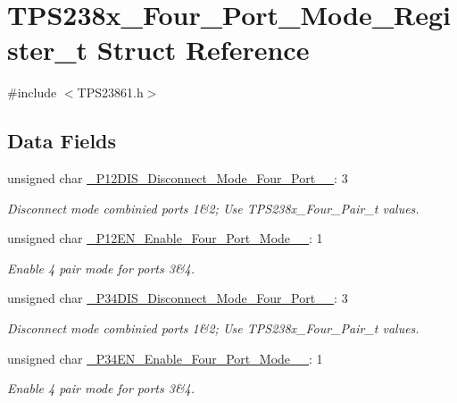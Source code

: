 \hypertarget{struct_t_p_s238x___four___port___mode___register__t}{\section{T\-P\-S238x\-\_\-\-Four\-\_\-\-Port\-\_\-\-Mode\-\_\-\-Register\-\_\-t Struct Reference}
\label{struct_t_p_s238x___four___port___mode___register__t}
}


{\ttfamily \#include $<$T\-P\-S23861.\-h$>$}

\subsection*{Data Fields}
\begin{DoxyCompactItemize}
\item 
unsigned char \hyperlink{struct_t_p_s238x___four___port___mode___register__t_a645698bd12e705f53aaf605d6ea8d5b6}{\-\_\-P12\-D\-I\-S\-\_\-\-Disconnect\-\_\-\-Mode\-\_\-\-Four\-\_\-\-Port\-\_\-\_}\-: 3
\begin{DoxyCompactList}\small\item\em Disconnect mode combinied ports 1\&2; Use T\-P\-S238x\-\_\-\-Four\-\_\-\-Pair\-\_\-t values. \end{DoxyCompactList}\item 
unsigned char \hyperlink{struct_t_p_s238x___four___port___mode___register__t_a39e1be93c2acd9f8e22aaf9f8bbe1f2d}{\-\_\-P12\-E\-N\-\_\-\-Enable\-\_\-\-Four\-\_\-\-Port\-\_\-\-Mode\-\_\-\_}\-: 1
\begin{DoxyCompactList}\small\item\em Enable 4 pair mode for ports 3\&4. \end{DoxyCompactList}\item 
unsigned char \hyperlink{struct_t_p_s238x___four___port___mode___register__t_a95d699031b796a9637f8dc05e80958a9}{\-\_\-P34\-D\-I\-S\-\_\-\-Disconnect\-\_\-\-Mode\-\_\-\-Four\-\_\-\-Port\-\_\-\_}\-: 3
\begin{DoxyCompactList}\small\item\em Disconnect mode combinied ports 1\&2; Use T\-P\-S238x\-\_\-\-Four\-\_\-\-Pair\-\_\-t values. \end{DoxyCompactList}\item 
unsigned char \hyperlink{struct_t_p_s238x___four___port___mode___register__t_a5f079d9ebd2b348e3d8ba863ebcf0f26}{\-\_\-P34\-E\-N\-\_\-\-Enable\-\_\-\-Four\-\_\-\-Port\-\_\-\-Mode\-\_\-\_}\-: 1
\begin{DoxyCompactList}\small\item\em Enable 4 pair mode for ports 3\&4. \end{DoxyCompactList}\end{DoxyCompactItemize}


